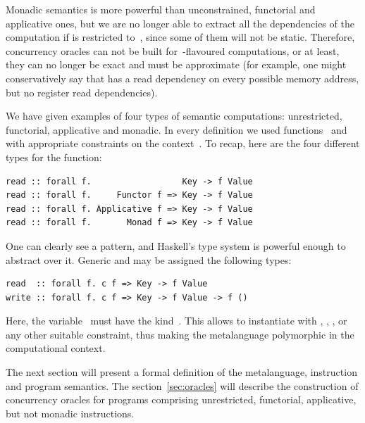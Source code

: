 Monadic semantics is more powerful than unconstrained, functorial and applicative ones,
but we are no longer able to extract all the dependencies of the computation if
 is restricted to~, since some of them will not be static.
Therefore, concurrency oracles can not be built for~-flavoured
computations, or at least, they can no longer be exact and must be approximate
(for example, one might conservatively say that  has a read
dependency on every possible memory address, but no register read dependencies).

We have given examples of four types of semantic computations: unrestricted,
functorial, applicative and monadic. In every definition we used
functions~ and~ with appropriate constraints on the
context~. To recap, here are the four different types for the 
function:

\begin{verbatim}
read :: forall f.                  Key -> f Value
read :: forall f.     Functor f => Key -> f Value
read :: forall f. Applicative f => Key -> f Value
read :: forall f.       Monad f => Key -> f Value
\end{verbatim}

\noindent
One can clearly see a pattern, and Haskell's type system is powerful enough to
abstract over it. Generic  and  may be assigned the
following types:

\begin{verbatim}
read  :: forall f. c f => Key -> f Value
write :: forall f. c f => Key -> f Value -> f ()
\end{verbatim}

\noindent
Here, the variable~ must have the kind~. This allows
to instantiate  with , , ,
 or any other suitable constraint, thus making the metalanguage
polymorphic in the computational context.

The next section will present a formal definition of the metalanguage, instruction
and program semantics. The section~\ref{sec:oracles} will describe the construction
of concurrency oracles for programs comprising unrestricted, functorial,
applicative, but not monadic instructions.
